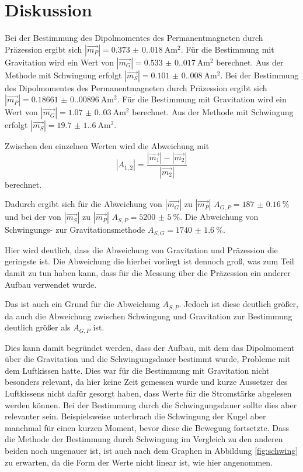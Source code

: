 \section{Diskussion}
Bei der Bestimmung des Dipolmomentes des Permanentmagneten durch Präzession ergibt sich $|\vec{m_P}|=\qty{0.373(0.018)}{\ampere\meter\squared}$. %
Für die Bestimmung mit Gravitation wird ein Wert von $|\vec{m_G}|=\qty{0.533(0.017)}{\ampere\meter\squared}$ berechnet.     %
Aus der Methode mit Schwingung erfolgt $|\vec{m_S}|=\qty{0.101(0.008)}{\ampere\meter\squared}$.                                %
Bei der Bestimmung des Dipolmomentes des Permanentmagneten durch Präzession ergibt sich $|\vec{m_P}|=\qty{0.18661(0.00896)}{\ampere\meter\squared}$.
Für die Bestimmung mit Gravitation wird ein Wert von $|\vec{m_G}|=\qty{1.07(0.03)}{\ampere\meter\squared}$ berechnet.
Aus der Methode mit Schwingung erfolgt $|\vec{m_S}|=\qty{19.7(1.6)}{\ampere\meter\squared}$.

Zwischen den einzelnen Werten wird die Abweichung mit 
\begin{equation}
    |A_{1,2}|=\frac{|\vec{m_1}|-|\vec{m_2}|}{|\vec{m_2}|}
\end{equation}
berechnet.

Dadurch ergibt sich für die Abweichung von $|\vec{m_G}|$ zu $|\vec{m_P}|$ $A_{G,P}=\qty{187(0.16)}{\percent}$ und bei der von $|\vec{m_S}|$ zu $|\vec{m_P}|$ $A_{S,P}=\qty{5200(5)}{\percent}$.
Die Abweichung von Schwingungs- zur Gravitationsmethode $A_{S,G}=\qty{1740(1.6)}{\percent}$.

Hier wird deutlich, dass die Abweichung von Gravitation und Präzession die geringste ist.
Die Abweichung die hierbei vorliegt ist dennoch groß, was zum Teil damit zu tun haben kann, dass für die Messung über die 
Präzession ein anderer Aufbau verwendet wurde.

Das ist auch ein Grund für die Abweichung $A_{S,P}$.
Jedoch ist diese deutlich größer, da auch die Abweichung zwischen Schwingung und Gravitation zur Bestimmung deutlich größer als $A_{G,P}$ ist.

Dies kann damit begründet werden, dass der Aufbau, mit dem das Dipolmoment über die Gravitation und 
die Schwingungsdauer bestimmt wurde, Probleme mit dem Luftkissen hatte.
Dies war für die Bestimmung mit Gravitation nicht besonders relevant, da hier keine Zeit gemessen wurde und kurze Aussetzer des Luftkissens nicht dafür gesorgt haben, dass Werte für die Stromstärke abgelesen werden können.
Bei der Bestimmung durch die Schwingungsdauer sollte dies aber relevanter sein.
Beispielsweise unterbrach die Schwingung der Kugel aber manchmal für 
einen kurzen Moment, bevor diese die Bewegung fortsetzte.
Dass die Methode der Bestimmung durch Schwingung im Vergleich zu den anderen beiden noch ungenauer ist, ist auch nach dem Graphen in Abbildung \ref{fig:schwing} zu erwarten, da die Form der Werte nicht linear ist, wie hier angenommen.
\label{sec:Diskussion}
